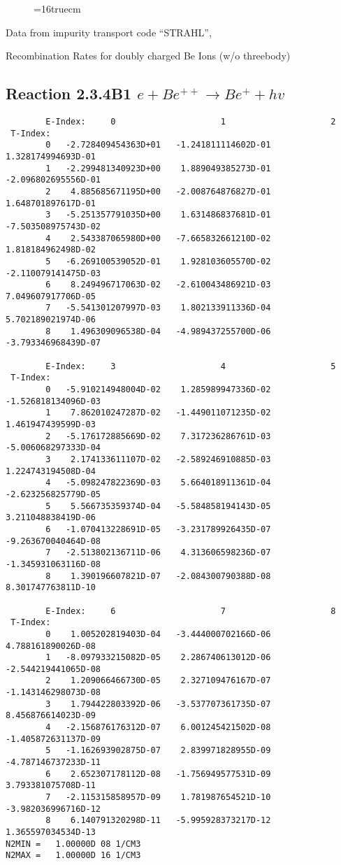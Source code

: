\documentclass[12pt,dvipdfmx]{article}
\begin{document}
\begin{figure} \label{2.3.4B0}
\epsfxsize=16truecm
\end{figure}
\newpage
Data from impurity transport code ``STRAHL'', \cite{kn:Behringer}

  Recombination Rates for doubly charged Be Ions (w/o threebody)
\subsection{
Reaction 2.3.4B1  $e + Be^{++} \rightarrow Be^+ + hv$
}

\begin{small}\begin{verbatim}
        E-Index:     0                     1                     2
 T-Index:
        0   -2.728409454363D+01   -1.241811114602D-01    1.328174994693D-01
        1   -2.299481340923D+00    1.889049385273D-01   -2.096802695556D-01
        2    4.885685671195D+00   -2.008764876827D-01    1.648701897617D-01
        3   -5.251357791035D+00    1.631486837681D-01   -7.503508975743D-02
        4    2.543387065980D+00   -7.665832661210D-02    1.818184962498D-02
        5   -6.269100539052D-01    1.928103605570D-02   -2.110079141475D-03
        6    8.249496717063D-02   -2.610043486921D-03    7.049607917706D-05
        7   -5.541301207997D-03    1.802133911336D-04    5.702189021974D-06
        8    1.496309096538D-04   -4.989437255700D-06   -3.793346968439D-07

        E-Index:     3                     4                     5
 T-Index:
        0   -5.910214948004D-02    1.285989947336D-02   -1.526818134096D-03
        1    7.862010247287D-02   -1.449011071235D-02    1.461947439599D-03
        2   -5.176172885669D-02    7.317236286761D-03   -5.006068297333D-04
        3    2.174133611107D-02   -2.589246910885D-03    1.224743194508D-04
        4   -5.098247822369D-03    5.664018911361D-04   -2.623256825779D-05
        5    5.566735359374D-04   -5.584858194143D-05    3.211048838419D-06
        6   -1.070413228691D-05   -3.231789926435D-07   -9.263670040464D-08
        7   -2.513802136711D-06    4.313606598236D-07   -1.345931063116D-08
        8    1.390196607821D-07   -2.084300790388D-08    8.301747763811D-10

        E-Index:     6                     7                     8
 T-Index:
        0    1.005202819403D-04   -3.444000702166D-06    4.788161890026D-08
        1   -8.097933215082D-05    2.286740613012D-06   -2.544219441065D-08
        2    1.209066466730D-05    2.327109476167D-07   -1.143146298073D-08
        3    1.794422803392D-06   -3.537707361735D-07    8.456876614023D-09
        4   -2.156876176312D-07    6.001245421502D-08   -1.405872631137D-09
        5   -1.162693902875D-07    2.839971828955D-09   -4.787146737233D-11
        6    2.652307178112D-08   -1.756949577531D-09    3.793381075708D-11
        7   -2.115315858957D-09    1.781987654521D-10   -3.982036996716D-12
        8    6.140791320298D-11   -5.995928373217D-12    1.365597034534D-13
N2MIN =   1.00000D 08 1/CM3
N2MAX =   1.00000D 16 1/CM3


\end{verbatim}
\end{small}
\end{document}
